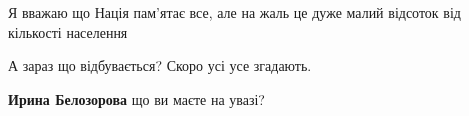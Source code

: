 \begin{itemize}
\begin{itemize}
\end{itemize} %

Я вважаю що Нація пам'ятає все, але на жаль це дуже малий відсоток від кількості населення

А зараз що відбувається? Скоро усі усе згадають.

\textbf{Ирина Белозорова} що ви маєте на увазі?


\end{itemize} %
